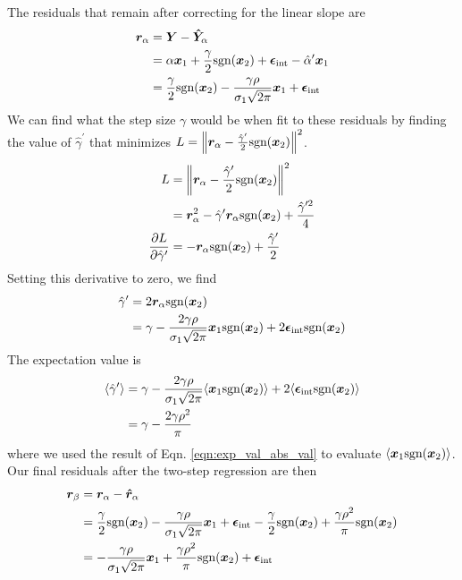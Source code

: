 The residuals that remain after correcting for the linear slope are
\begin{align*}
    \bm{r}_\alpha &= \bm{Y} - \bm{\hat{Y}}_\alpha\\
    &= \alpha\bm{x}_1 + \frac{\gamma}{2}\text{sgn}(\bm{x}_2) +\bm{\epsilon}_\text{int} - \hat{\alpha}^\prime\bm{x}_1\\
    &= \frac{\gamma}{2}\text{sgn}(\bm{x}_2) - \frac{\gamma\rho}{\sigma_1\sqrt{2\pi}}\bm{x}_1 + \bm{\epsilon}_\text{int}
\end{align*}
We can find what the step size $\gamma$ would be when fit to these residuals by finding the value of $\hat{\gamma}^\prime$ that minimizes $L=\left\|\bm{r}_\alpha - \frac{\hat{\gamma}^\prime}{2}\text{sgn}(\bm{x}_2)\right\|^2$.
\begin{align*}
    L &= \left\|\bm{r}_\alpha - \frac{\hat{\gamma}^\prime}{2}\text{sgn}(\bm{x}_2)\right\|^2\\
    &= \bm{r}_\alpha^2 - \hat{\gamma}^\prime\bm{r}_\alpha\text{sgn}(\bm{x}_2) + \frac{\hat{\gamma}^{\prime 2}}{4}\\
    \frac{\partial L}{\partial \hat{\gamma}^\prime} &= -\bm{r}_\alpha\text{sgn}(\bm{x}_2) + \frac{\hat{\gamma}^\prime}{2}
\end{align*}
Setting this derivative to zero, we find
\begin{align*}
    \hat{\gamma}^\prime &= 2\bm{r}_\alpha\text{sgn}(\bm{x}_2)\\
    &= \gamma - \frac{2\gamma\rho}{\sigma_1\sqrt{2\pi}}\bm{x}_1\text{sgn}(\bm{x}_2) + 2\bm{\epsilon}_\text{int}\text{sgn}(\bm{x}_2)
\end{align*}
The expectation value is
\begin{align*}
    \langle\hat{\gamma}^\prime\rangle &= \gamma - \frac{2\gamma\rho}{\sigma_1\sqrt{2\pi}}\langle\bm{x}_1\text{sgn}(\bm{x}_2)\rangle + 2\langle\bm{\epsilon}_\text{int}\text{sgn}(\bm{x}_2)\rangle\\
    &= \gamma - \frac{2\gamma\rho^2}{\pi}
\end{align*}
where we used the result of Eqn. \ref{eqn:exp_val_abs_val} to evaluate $\langle\bm{x}_1\text{sgn}(\bm{x}_2)\rangle$. Our final residuals after the two-step regression are then
\begin{align*}
    \bm{r}_\beta &= \bm{r}_\alpha - \bm{\hat{r}}_\alpha \\
    &= \frac{\gamma}{2}\text{sgn}(\bm{x}_2) - \frac{\gamma\rho}{\sigma_1\sqrt{2\pi}}\bm{x}_1 + \bm{\epsilon}_\text{int} - \frac{\gamma}{2}\text{sgn}(\bm{x}_2) + \frac{\gamma\rho^2}{\pi}\text{sgn}(\bm{x}_2)\\
    &= -\frac{\gamma\rho}{\sigma_1\sqrt{2\pi}}\bm{x}_1+\frac{\gamma\rho^2}{\pi}\text{sgn}(\bm{x}_2)+\bm{\epsilon}_\text{int}
\end{align*}
